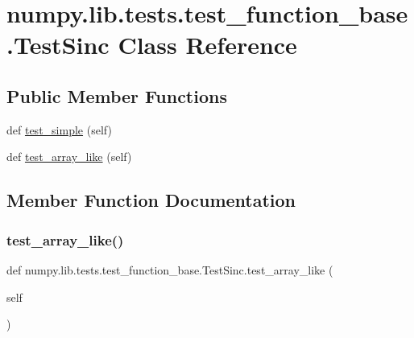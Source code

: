 \hypertarget{classnumpy_1_1lib_1_1tests_1_1test__function__base_1_1TestSinc}{}\section{numpy.\+lib.\+tests.\+test\+\_\+function\+\_\+base.\+Test\+Sinc Class Reference}
\label{classnumpy_1_1lib_1_1tests_1_1test__function__base_1_1TestSinc}
\subsection*{Public Member Functions}
\begin{DoxyCompactItemize}
\item 
def \hyperlink{classnumpy_1_1lib_1_1tests_1_1test__function__base_1_1TestSinc_a49cc2564a5c00c7c4bfde1f9efe1dce3}{test\+\_\+simple} (self)
\item 
def \hyperlink{classnumpy_1_1lib_1_1tests_1_1test__function__base_1_1TestSinc_aafd2ca287f59ec9506f1e36d0a95b1b6}{test\+\_\+array\+\_\+like} (self)
\end{DoxyCompactItemize}


\subsection{Member Function Documentation}
\mbox{\label{classnumpy_1_1lib_1_1tests_1_1test__function__base_1_1TestSinc_aafd2ca287f59ec9506f1e36d0a95b1b6}} 
\subsubsection{\texorpdfstring{test\+\_\+array\+\_\+like()}{test\_array\_like()}}
{\footnotesize\ttfamily def numpy.\+lib.\+tests.\+test\+\_\+function\+\_\+base.\+Test\+Sinc.\+test\+\_\+array\+\_\+like (\begin{DoxyParamCaption}\item[{}]{self }\end{DoxyParamCaption})}

